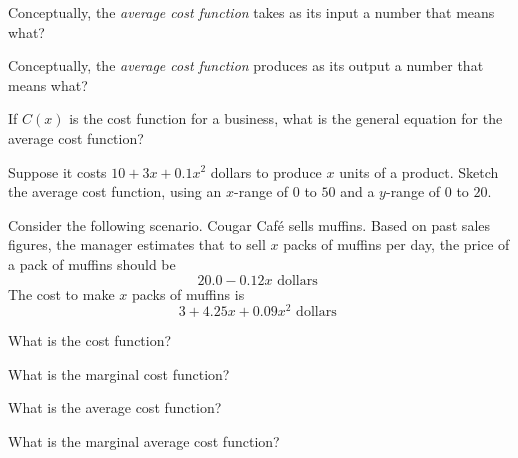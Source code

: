 \label{sec:biz-mod-avg-cost}

\begin{ProblemSet}[pencil space=1in]
 \begin{Problem}
  Conceptually, the \emph{average cost function} takes as its input a number that means what?
 \end{Problem}
 \begin{Problem}
  Conceptually, the \emph{average cost function} produces as its output a number that means what?
 \end{Problem}
 \begin{Problem}
  If $C(x)$ is the cost function for a business, what is the general equation for the average cost function?
 \end{Problem}
 \begin{Problem}
  Suppose it costs $10 + 3x + 0.1 x^2$ dollars to produce $x$ units of a product.
  Sketch the average cost function, using an $x$-range of $0$ to $50$ and a $y$-range of $0$ to $20$.
  \bigskip

  \GraphingGridSmall
 \end{Problem}
\end{ProblemSet}

\newpage
Consider the following scenario.
Cougar Caf\'e sells muffins.
Based on past sales figures, the manager estimates that to sell $x$ packs of muffins per day, the price of a pack of muffins should be
\begin{equation*}
 20.0 - 0.12 x \text{ dollars }
\end{equation*}
The cost to make $x$ packs of muffins is
\begin{equation*}
 3 + 4.25 x + 0.09 x^2 \text{ dollars }
\end{equation*}


\begin{ProblemSet}[pencil space=1in]
 \begin{Problem}
  What is the cost function?
 \end{Problem}
 \begin{Problem}
  What is the marginal cost function?
 \end{Problem}
 \begin{Problem}[pencil space=2in]
  What is the average cost function?
 \end{Problem}
 \begin{Problem}[pencil space=2in]
  What is the marginal average cost function?
 \end{Problem}
\end{ProblemSet}


